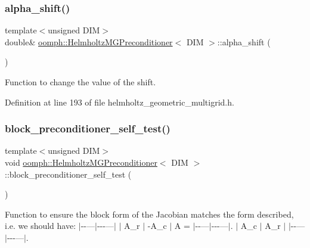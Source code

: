 \subsubsection{\texorpdfstring{alpha\+\_\+shift()}{alpha\_shift()}}
{\footnotesize\ttfamily template$<$unsigned D\+IM$>$ \\
double\& \hyperlink{classoomph_1_1HelmholtzMGPreconditioner}{oomph\+::\+Helmholtz\+M\+G\+Preconditioner}$<$ D\+IM $>$\+::alpha\+\_\+shift (\begin{DoxyParamCaption}{ }\end{DoxyParamCaption})\hspace{0.3cm}{\ttfamily [inline]}}



Function to change the value of the shift. 



Definition at line 193 of file helmholtz\+\_\+geometric\+\_\+multigrid.\+h.

\mbox{\label{classoomph_1_1HelmholtzMGPreconditioner_a935a8245757bc2bd7bf29f1ce029af77}} 
\subsubsection{\texorpdfstring{block\+\_\+preconditioner\+\_\+self\+\_\+test()}{block\_preconditioner\_self\_test()}}
{\footnotesize\ttfamily template$<$unsigned D\+IM$>$ \\
void \hyperlink{classoomph_1_1HelmholtzMGPreconditioner}{oomph\+::\+Helmholtz\+M\+G\+Preconditioner}$<$ D\+IM $>$\+::block\+\_\+preconditioner\+\_\+self\+\_\+test (\begin{DoxyParamCaption}{ }\end{DoxyParamCaption})\hspace{0.3cm}{\ttfamily [private]}}



Function to ensure the block form of the Jacobian matches the form described, i.\+e. we should have\+: $\vert$-\/-\/---$\vert$-\/-\/-\/---$\vert$ $\vert$ A\+\_\+r $\vert$ -\/\+A\+\_\+c $\vert$ A = $\vert$-\/-\/---$\vert$-\/-\/-\/---$\vert$. $\vert$ A\+\_\+c $\vert$ A\+\_\+r $\vert$ $\vert$-\/-\/---$\vert$-\/-\/-\/---$\vert$. 

